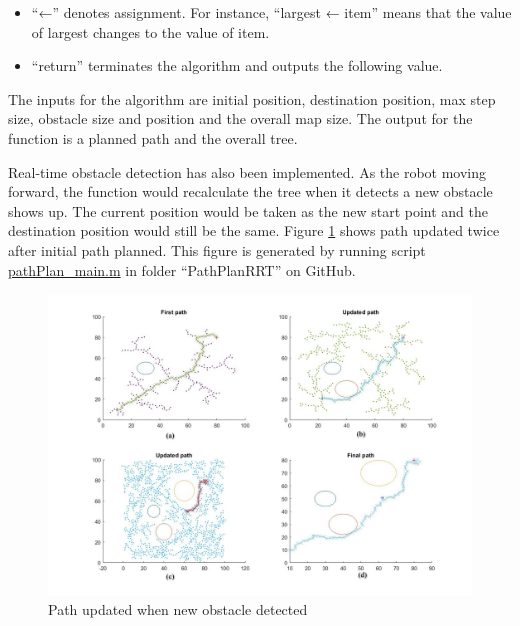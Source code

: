 \documentclass[
  oneside]{ubcthesis}
\providecommand{\tightlist}{%
  \setlength{\itemsep}{0pt}\setlength{\parskip}{0pt}}
\begin{document}
\begin{itemize}
\tightlist
\item
  ``←'' denotes assignment. For instance, ``largest ← item'' means that the value of largest changes to the value of item.
\item
  ``return'' terminates the algorithm and outputs the following value.
\end{itemize}

The inputs for the algorithm are initial position, destination position, max step size, obstacle size and position and the overall map size. The output for the function is a planned path and the overall tree.

Real-time obstacle detection has also been implemented. As the robot moving forward, the function would recalculate the tree when it detects a new obstacle shows up. The current position would be taken as the new start point and the destination position would still be the same. Figure \ref{fig:figure2} shows path updated twice after initial path planned. This figure is generated by running script \href{https://github.com/luckymeng7/EECE597/blob/master/PathPlanRRT/pathPlan_main.m}{pathPlan\_main.m} in folder ``PathPlanRRT'' on GitHub.

\begin{figure}

{\centering \includegraphics[width=0.9\linewidth]{figures/2-1} 

}

\caption{Path updated when new obstacle detected}\label{fig:figure2}
\end{figure}
\end{document}
